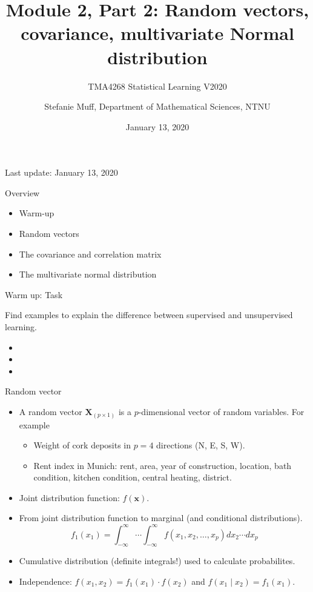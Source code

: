 \documentclass[ignorenonframetext,]{beamer}
\title{Module 2, Part 2: Random vectors, covariance, multivariate Normal
distribution}
\subtitle{TMA4268 Statistical Learning V2020}
\author{Stefanie Muff, Department of Mathematical Sciences, NTNU}
\date{January 13, 2020}
\providecommand{\tightlist}{%
  \setlength{\itemsep}{0pt}\setlength{\parskip}{0pt}}
\begin{document}
\frame{\titlepage}

\begin{frame}

Last update: January 13, 2020

\end{frame}

\begin{frame}{Overview}

\normalsize

\begin{itemize}
\item
  Warm-up \vspace{2mm}
\item
  Random vectors \vspace{2mm}
\item
  The covariance and correlation matrix \vspace{2mm}
\item
  The multivariate normal distribution
\end{itemize}

\end{frame}

\begin{frame}{Warm up: Task}

Find examples to explain the difference between supervised and
unsupervised learning.

\begin{itemize}
\item
\item
\item
\end{itemize}

\end{frame}

\begin{frame}{Random vector}

\begin{itemize}
\tightlist
\item
  A random vector \(\boldsymbol{X}_{(p\times 1)}\) is a
  \(p\)-dimensional vector of random variables. For example

  \begin{itemize}
  \tightlist
  \item
    Weight of cork deposits in \(p=4\) directions (N, E, S, W).
  \item
    Rent index in Munich: rent, area, year of construction, location,
    bath condition, kitchen condition, central heating, district.
  \end{itemize}
\item
  Joint distribution function: \(f(\boldsymbol{x})\).
\item
  From joint distribution function to marginal (and conditional
  distributions).
  \[f_1(x_1)=\int_{-\infty}^{\infty}\cdots \int_{-\infty}^{\infty} f(x_1,x_2,\ldots,x_p)dx_2 \cdots dx_p\]
\item
  Cumulative distribution (definite integrals!) used to calculate
  probabilites.
\item
  Independence: \(f(x_1,x_2)=f_1(x_1)\cdot f(x_2)\) and
  \(f(x_1\mid x_2)=f_1(x_1).\)
\end{itemize}

\end{frame}
\end{document}
